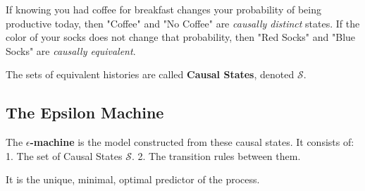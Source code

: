 \begin{intuition}
    If knowing you had coffee for breakfast changes your probability of being productive today, then "Coffee" and "No Coffee" are \textit{causally distinct} states. If the color of your socks does not change that probability, then "Red Socks" and "Blue Socks" are \textit{causally equivalent}.
\end{intuition}

The sets of equivalent histories are called \textbf{Causal States}, denoted $\mathcal{S}$.

\subsection{The Epsilon Machine}
The \textbf{$\epsilon$-machine} is the model constructed from these causal states. It consists of:
1. The set of Causal States $\mathcal{S}$.
2. The transition rules between them.

It is the unique, minimal, optimal predictor of the process.
